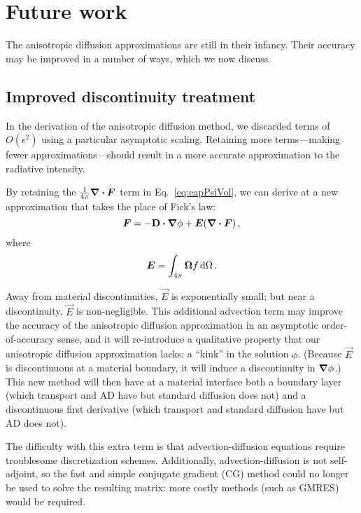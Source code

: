 \section{Future work}

The anisotropic diffusion approximations are still in their infancy. Their
accuracy may be improved in a number of ways, which we now discuss.

\subsection{Improved discontinuity treatment}

In the derivation of the anisotropic diffusion method, we discarded
terms of $O(\epsilon^2)$ using a particular asymptotic scaling. Retaining more
terms---making fewer approximations---should result in a more accurate
approximation to the radiative intensity.

By retaining the $\frac{1}{4\pi} \bm{\nabla} \bm{\cdot} \bm{F}$ term in
Eq.~\eqref{eq:capPsiVol}, we can derive at a new approximation that takes the place
of Fick's law:
\begin{equation*}
  \bm{F} = - \mathbf{D} \bm{\cdot} \bm{\nabla} \phi + \bm{E} (\bm{\nabla} \bm{\cdot}\bm{F})\,,
\end{equation*}
where
\begin{equation*}
  \bm{E} = \int_{4\pi} \bm{\Omega} f \mathop{}\!\mathrm{d}\Omega\,.
\end{equation*}

Away from material discontinuities, $\vec{E}$ is exponentially small; but
near a discontinuity, $\vec{E}$ is non-negligible. This additional advection
term may
improve the accuracy of the anisotropic diffusion approximation in an
asymptotic order-of-accuracy sense, and it will re-introduce a qualitative
property that our anisotropic
diffusion approximation lacks: a ``kink'' in the solution $\phi$. (Because
$\vec{E}$ is discontinuous at a material boundary, it will induce a
discontinuity in $\bm{\nabla} \phi$.) This new method will then have at a material
interface both a boundary layer (which transport and AD have but standard
diffusion does not) and a discontinuous first derivative (which transport and
standard diffusion have but AD does not).

The difficulty with this extra term is that advection-diffusion equations
require troublesome discretization schemes. Additionally, advection-diffusion is
not self-adjoint,
so the fast and simple conjugate gradient (CG) method could no longer be used to
solve the resulting matrix: more costly methods (such as GMRES) would be
required.

